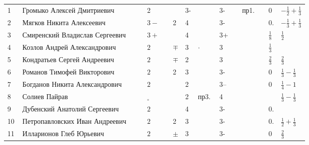 \documentclass[a4paper,11pt]{article}
\newcommand*\OK{&\small \ding{51}$\!\!_\circ$} %
\newcommand*\ok{&{\small \ding{51}}} %
\newcommand*\no{&{\small }} %
\newcommand\PM{&$\pm$}
\newcommand\MP{&$\mp$}
\begin{document}
\begin{tabular}{p{7pt}|l|p{6pt}p{6pt}p{6pt}p{6pt}p{6pt}p{6pt}p{16pt}p{6pt}p{6pt}p{16pt}p{6pt}p{6pt}p{32pt}}
\\
\midrule
		1\,&Громыко Алексей Дмитриевич	     \ok\ok&2   \ok\no&3-\no     &3- \ok&пр1.\ok&0           &$-\frac{1}{2}+\frac{1}{3}$ \\
		2\,&Мягков Никита Алексеевич         \ok\ok&$3-$\ok&2  &4\no     &3- \ok\no  \ok&0.          &$-\frac{1}{3}+\frac{1}{3}$ \\		
		3\,&Смиренский Владислав Сергеевич   \ok\ok&$3+$\ok\no &4\no     &3+ \ok\ok  \ok&$\frac{1}{8}$&$\frac{1}{2}$ \\
		4\,&Козлов Андрей Александрович      \ok\ok&$2$ \ok\MP &3&$\cdot$&3  \ok\ok  \no&$\frac{1}{3}$ \ok\\
		5\,&Кондратьев Сергей Андреевич      \ok\ok&$2$ \ok\MP &2\no     &3  \ok\ok  \ok&$\frac{2}{3}$&$\frac{2}{3}$ \\
		6\,&Романов Тимофей Викторович       \ok\ok&$2$ \ok&2  &3\no     &3- \ok\ok  \ok&0            & $\frac{1}{3}-\frac{1}{3}$\\
		7\,&Богданов Никита Александрович    \ok\no&$2$ \ok\no &2\no     &3--\ok\ok  \ok&0            & $\frac{1}{4}-1$\\
		8\,&Солиев Пайрав                    \ok\ok\OK  \no\ok &2&пр3.$\;$&4 \ok\ok  \ok\no           & $\frac{1}{3}-\frac{1}{3}$\\
		9\,&Дубенский Анатолий Сергеевич     \ok\ok&$2$ \ok\no &4\no     &3- \ok\ok  \ok&0.           \no \\
\midrule
		10\,&Петропавловских Иван Андреевич  \ok\ok&$2$ \ok&2  &3\no     &3- \ok\ok  \ok&0.           &$\frac{1}{2}+\frac{1}{3}$ \\
		11\,&Илларионов Глеб Юрьевич         \ok\ok&$2$ \ok\PM &3\no     &3- \ok\ok  \ok&0            &$\frac{2}{3}$ \\
\bottomrule
\end{tabular} 
\end{document}
